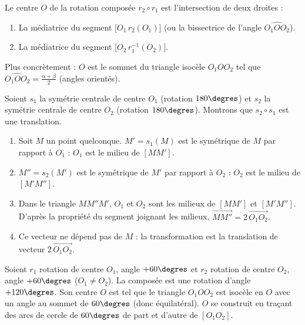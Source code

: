 \documentclass[11pt]{article}
\begin{document}
\begin{aretenir}
Le centre $O$ de la rotation composée $r_2 \circ r_1$ est l'intersection de deux droites :
\begin{enumerate}
\item La médiatrice du segment $\big[O_1\, r_2(O_1)\big]$ (ou la bissectrice de l'angle $\widehat{O_1 O O_2}$).
\item La médiatrice du segment $\big[O_2\, r_1^{-1}(O_2)\big]$.
\end{enumerate}
Plus concrètement : $O$ est le sommet du triangle isocèle $O_1 O O_2$ tel que $\widehat{O_1 O O_2} = \frac{\alpha+\beta}{2}$ (angles orientés).
\end{aretenir}

\begin{experience}
Soient $s_1$ la symétrie centrale de centre $O_1$ (rotation $180\degres$) et $s_2$ la symétrie centrale de centre $O_2$ (rotation $180\degres$). Montrons que $s_2 \circ s_1$ est une translation.
\begin{enumerate}
\item Soit $M$ un point quelconque. $M' = s_1(M)$ est le symétrique de $M$ par rapport à $O_1$ : $O_1$ est le milieu de $[MM']$.
\item $M'' = s_2(M')$ est le symétrique de $M'$ par rapport à $O_2$ : $O_2$ est le milieu de $[M'M'']$.
\item Dans le triangle $MM''M'$, $O_1$ et $O_2$ sont les milieux de $[MM']$ et $[M'M'']$. D'après la propriété du segment joignant les milieux, $\overrightarrow{MM''} = 2\,\overrightarrow{O_1O_2}$.
\item Ce vecteur ne dépend pas de $M$ : la transformation est la translation de vecteur $2\,\overrightarrow{O_1O_2}$.
\end{enumerate}
\end{experience}

\begin{exemplebox}
Soient $r_1$ rotation de centre $O_1$, angle $+60\degres$ et $r_2$ rotation de centre $O_2$, angle $+60\degres$ ($O_1 \neq O_2$). La composée est une rotation d'angle $+120\degres$. Son centre $O$ est tel que le triangle $O_1 O O_2$ est isocèle en $O$ avec un angle au sommet de $60\degres$ (donc équilatéral). $O$ se construit en traçant des arcs de cercle de $60\degres$ de part et d'autre de $[O_1O_2]$.
\end{exemplebox}
\end{document}
